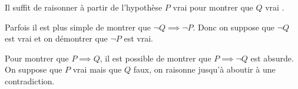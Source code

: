 \begin{definition}
	Il suffit de raisonner à partir de l'hypothèse \og $P$ vrai \fg pour montrer que \og $Q$ vrai \fg . 
\end{definition}

\begin{definition}
	Parfois il est plus simple de montrer que $\neg Q \implies \neg P$.
	Donc on suppose que $\neg Q$ est vrai et on démontrer que $\neg P$ est vrai.
\end{definition}

\begin{definition}
	Pour montrer que $P \implies Q$, il est possible de montrer que $P \implies \neg Q$ est absurde.
	\\
	On suppose que $P$ vrai mais que $Q$ faux, on raisonne jusqu'à aboutir à une contradiction.
\end{definition}